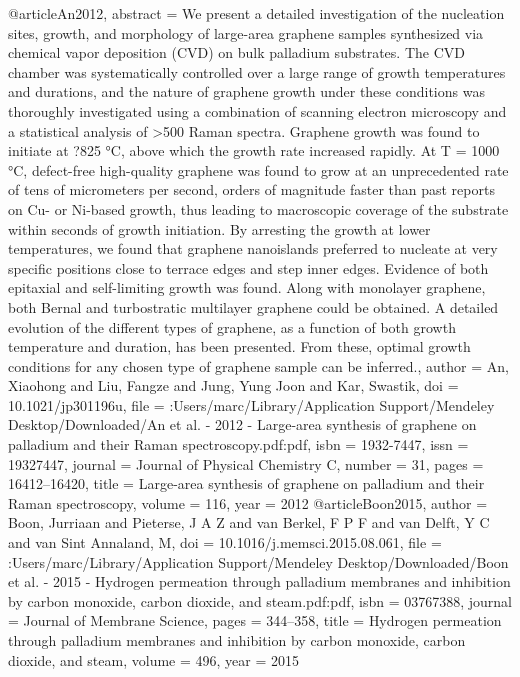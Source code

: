 @article{An2012,
abstract = {We present a detailed investigation of the nucleation sites, growth, and morphology of large-area graphene samples synthesized via chemical vapor deposition (CVD) on bulk palladium substrates. The CVD chamber was systematically controlled over a large range of growth temperatures and durations, and the nature of graphene growth under these conditions was thoroughly investigated using a combination of scanning electron microscopy and a statistical analysis of {\textgreater}500 Raman spectra. Graphene growth was found to initiate at ?825 °C, above which the growth rate increased rapidly. At T = 1000 °C, defect-free high-quality graphene was found to grow at an unprecedented rate of tens of micrometers per second, orders of magnitude faster than past reports on Cu- or Ni-based growth, thus leading to macroscopic coverage of the substrate within seconds of growth initiation. By arresting the growth at lower temperatures, we found that graphene nanoislands preferred to nucleate at very specific positions close to terrace edges and step inner edges. Evidence of both epitaxial and self-limiting growth was found. Along with monolayer graphene, both Bernal and turbostratic multilayer graphene could be obtained. A detailed evolution of the different types of graphene, as a function of both growth temperature and duration, has been presented. From these, optimal growth conditions for any chosen type of graphene sample can be inferred.},
author = {An, Xiaohong and Liu, Fangze and Jung, Yung Joon and Kar, Swastik},
doi = {10.1021/jp301196u},
file = {:Users/marc/Library/Application Support/Mendeley Desktop/Downloaded/An et al. - 2012 - Large-area synthesis of graphene on palladium and their Raman spectroscopy.pdf:pdf},
isbn = {1932-7447},
issn = {19327447},
journal = {Journal of Physical Chemistry C},
number = {31},
pages = {16412--16420},
title = {{Large-area synthesis of graphene on palladium and their Raman spectroscopy}},
volume = {116},
year = {2012}
}
@article{Boon2015,
author = {Boon, Jurriaan and Pieterse, J A Z and van Berkel, F P F and van Delft, Y C and {van Sint Annaland}, M},
doi = {10.1016/j.memsci.2015.08.061},
file = {:Users/marc/Library/Application Support/Mendeley Desktop/Downloaded/Boon et al. - 2015 - Hydrogen permeation through palladium membranes and inhibition by carbon monoxide, carbon dioxide, and steam.pdf:pdf},
isbn = {03767388},
journal = {Journal of Membrane Science},
pages = {344--358},
title = {{Hydrogen permeation through palladium membranes and inhibition by carbon monoxide, carbon dioxide, and steam}},
volume = {496},
year = {2015}
}
